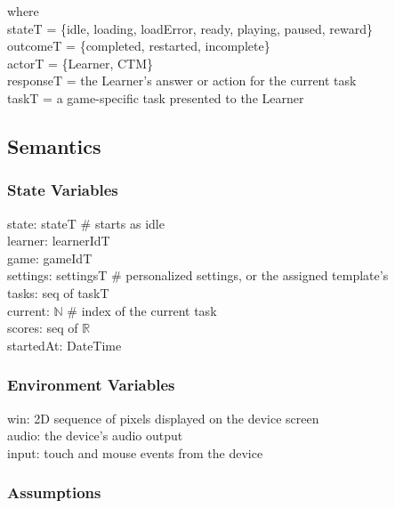 \documentclass[12pt, titlepage]{article}
\begin{document}
\noindent where \\
stateT = \{idle, loading, loadError, ready, playing, paused, reward\} \\
outcomeT = \{completed, restarted, incomplete\} \\
actorT = \{Learner, CTM\} \\
responseT = the Learner's answer or action for the current task \\
taskT = a game-specific task presented to the Learner

\subsection{Semantics}

\subsubsection{State Variables}

state: stateT \# starts as idle \\
learner: learnerIdT \\
game: gameIdT \\
settings: settingsT \# personalized settings, or the assigned template's \\
tasks: seq of taskT \\
current: $\mathbb{N}$ \# index of the current task \\
scores: seq of $\mathbb{R}$ \\
startedAt: DateTime

\subsubsection{Environment Variables}

win: 2D sequence of pixels displayed on the device screen \\
audio: the device's audio output \\
input: touch and mouse events from the device

\subsubsection{Assumptions}
\end{document}

